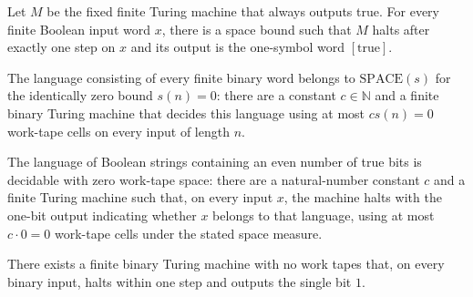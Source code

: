 \begin{theorem}
\label{Complexity.constTrueTM_computesInTime}
\leanok
{}
Let $M$ be the fixed finite Turing machine that always outputs true. For every finite
Boolean input word $x$, there is a space bound such that $M$ halts after exactly one
step on $x$ and its output is the one-symbol word $[\mathrm{true}]$.
\end{theorem}

\begin{theorem}
\label{Complexity.trueLang_mem_SPACE_zero}
\leanok
{}
The language consisting of every finite binary word belongs to $\mathrm{SPACE}(s)$ for
the identically zero bound $s(n)=0$: there are a constant $c\in\mathbb N$ and a finite
binary Turing machine that decides this language using at most $c s(n)=0$ work-tape
cells on every input of length $n$.
\end{theorem}

\begin{theorem}
\label{Complexity.evenLang_mem_SPACE_zero}
\leanok
{}
The language of Boolean strings containing an even number of true bits is decidable with
zero work-tape space: there are a natural-number constant $c$ and a finite Turing
machine such that, on every input $x$, the machine halts with the one-bit output
indicating whether $x$ belongs to that language, using at most $c\cdot 0=0$ work-tape
cells under the stated space measure.
\end{theorem}

\begin{theorem}
\label{Complexity.exists_zeroTape_const_oneStep}
\leanok
{}
There exists a finite binary Turing machine with no work tapes that, on every binary
input, halts within one step and outputs the single bit $1$.
\end{theorem}

